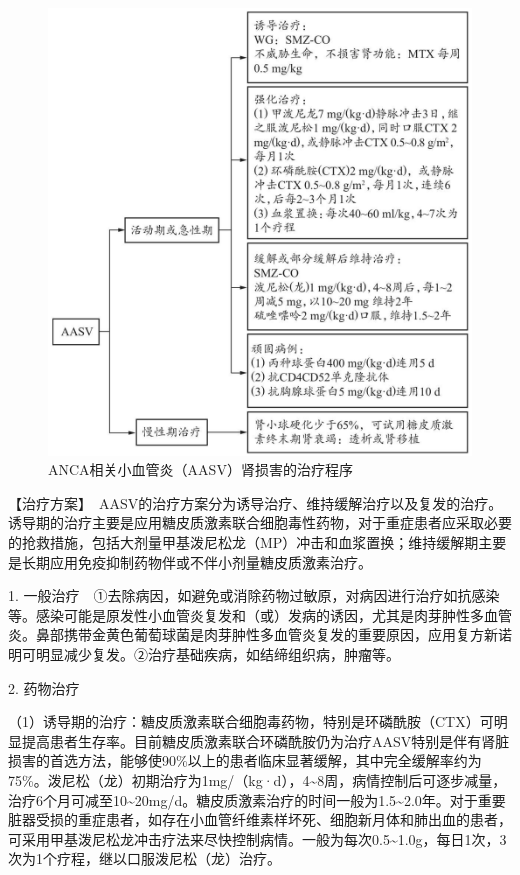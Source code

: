 \begin{figure}[!htbp]
 \centering
 \includegraphics{./images/Image00127.jpg}
 \captionsetup{justification=centering}
 \caption{ANCA相关小血管炎（AASV）肾损害的治疗程序}
 \label{fig4-2-3}
  \end{figure} 

【治疗方案】　AASV的治疗方案分为诱导治疗、维持缓解治疗以及复发的治疗。诱导期的治疗主要是应用糖皮质激素联合细胞毒性药物，对于重症患者应采取必要的抢救措施，包括大剂量甲基泼尼松龙（MP）冲击和血浆置换；维持缓解期主要是长期应用免疫抑制药物伴或不伴小剂量糖皮质激素治疗。

1.
一般治疗　①去除病因，如避免或消除药物过敏原，对病因进行治疗如抗感染等。感染可能是原发性小血管炎复发和（或）发病的诱因，尤其是肉芽肿性多血管炎。鼻部携带金黄色葡萄球菌是肉芽肿性多血管炎复发的重要原因，应用复方新诺明可明显减少复发。②治疗基础疾病，如结缔组织病，肿瘤等。

2. 药物治疗

（1）诱导期的治疗：糖皮质激素联合细胞毒药物，特别是环磷酰胺（CTX）可明显提高患者生存率。目前糖皮质激素联合环磷酰胺仍为治疗AASV特别是伴有肾脏损害的首选方法，能够使90\%以上的患者临床显著缓解，其中完全缓解率约为75\%。泼尼松（龙）初期治疗为1mg/（kg·d），4\textasciitilde{}8周，病情控制后可逐步减量，治疗6个月可减至10\textasciitilde{}20mg/d。糖皮质激素治疗的时间一般为1.5\textasciitilde{}2.0年。对于重要脏器受损的重症患者，如存在小血管纤维素样坏死、细胞新月体和肺出血的患者，可采用甲基泼尼松龙冲击疗法来尽快控制病情。一般为每次0.5\textasciitilde{}1.0g，每日1次，3次为1个疗程，继以口服泼尼松（龙）治疗。

